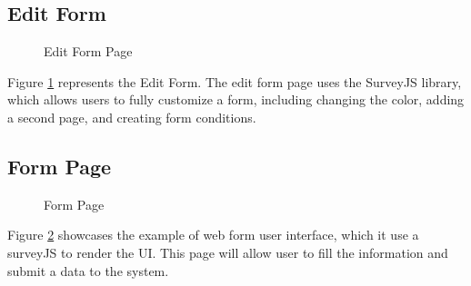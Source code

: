 \documentclass[12pt,oneside,openright,a4paper]{cpe-english-project}
\begin{document}
\newpage
\subsection{Edit Form}

\begin{figure}[!h]
\centering
{}
\caption{Edit Form Page}\label{fig:edit-form}
\end{figure}

Figure \ref{fig:edit-form}  represents the Edit Form. The edit form page uses the SurveyJS library, which allows users to fully customize a form, including changing the color, adding a second page, and creating form conditions.

\subsection{Form Page}

\begin{figure}[!h]
\centering
{}
\caption{Form Page}\label{fig:form-page}
\end{figure}

Figure \ref{fig:form-page} showcases the example of web form user interface, which it use a surveyJS to render the UI. This  page will allow user to fill the information and submit a data to the system.
\end{document}
